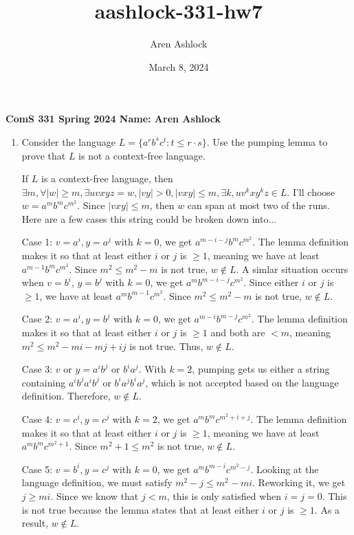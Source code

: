 \documentclass[12pt]{article}
\title{aashlock-331-hw7}
\author{Aren Ashlock}
\date{March 8, 2024}
\begin{document}
\noindent\textbf{ComS 331 \quad Spring 2024 \quad Name: Aren Ashlock}

\begin{enumerate}


\item Consider the language $L = \{a^rb^sc^t : t \leq r \cdot s\}$. Use the pumping lemma to prove that $L$ is not a context-free language.

\color{blue} If $L$ is a context-free language, then $\exists m, \forall |w| \geq m, \exists uvxyz = w, |vy| > 0, |vxy| \leq m, \exists k, uv^kxy^kz \in L$. I'll choose $w = a^mb^mc^{m^2}$. Since $|vxy| \leq m$, then $w$ can span at most two of the runs. Here are a few cases this string could be broken down into...

Case 1: $v = a^i, y = a^j$ with $k = 0$, we get $a^{m-i-j}b^mc^{m^2}$. The lemma definition makes it so that at least either $i$ or $j$ is $\geq 1$, meaning we have at least $a^{m-1}b^mc^{m^2}$. Since $m^2 \leq m^2 - m$ is not true, $w \notin L$. A simlar situation occurs when $v = b^i$, $y = b^j$ with $k = 0$, we get $a^mb^{m-i-j}c^{m^2}$. Since either $i$ or $j$ is $\geq 1$, we have at least $a^mb^{m-1}c^{m^2}$. Since $m^2 \leq m^2 - m$ is not true, $w \notin L$.

Case 2: $v = a^i, y = b^j$ with $k = 0$, we get $a^{m-i}b^{m-j}c^{m^2}$. The lemma definition makes it so that at least either $i$ or $j$ is $\geq 1$ and both are $< m$, meaning $m^2 \leq m^2 -mi - mj + ij$ is not true. Thus, $w \notin L$.

Case 3: $v$ or $y = a^ib^j$ or $b^ia^j$. With $k = 2$, pumping gets us either a string containing $a^ib^ja^ib^j$ or $b^ia^jb^ia^j$, which is not accepted based on the language definition. Therefore, $w \notin L$.

Case 4: $v = c^i, y = c^j$ with $k = 2$, we get $a^mb^mc^{m^2+i+j}$. The lemma definition makes it so that at least either $i$ or $j$ is $\geq 1$, meaning we have at least $a^mb^mc^{m^2+1}$. Since $m^2 + 1 \leq m^2$ is not true, $w \notin L$.

Case 5: $v = b^i, y = c^j$ with $k = 0$, we get $a^mb^{m-i}c^{m^2-j}$. Looking at the language definition, we must satisfy $m^2 - j \leq m^2 - mi$. Reworking it, we get $j \geq mi$. Since we know that $j < m$, this is only satisfied when $i = j = 0$. This is not true because the lemma states that at least either $i$ or $j$ is $\geq 1$. As a result, $w \notin L$.


\end{enumerate}
\end{document}
